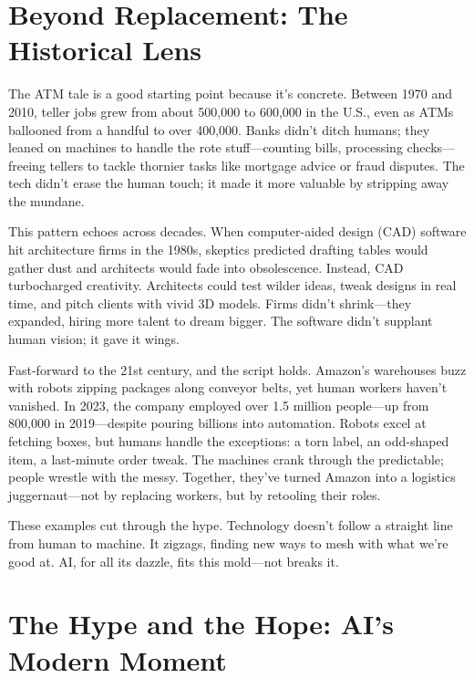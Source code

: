\documentclass[
  Letterpaper,
]{scrbook}
\begin{document}
\section{Beyond Replacement: The Historical
Lens}\label{beyond-replacement-the-historical-lens}

The ATM tale is a good starting point because it's concrete. Between
1970 and 2010, teller jobs grew from about 500,000 to 600,000 in the
U.S., even as ATMs ballooned from a handful to over 400,000. Banks
didn't ditch humans; they leaned on machines to handle the rote
stuff---counting bills, processing checks---freeing tellers to tackle
thornier tasks like mortgage advice or fraud disputes. The tech didn't
erase the human touch; it made it more valuable by stripping away the
mundane.

This pattern echoes across decades. When computer-aided design (CAD)
software hit architecture firms in the 1980s, skeptics predicted
drafting tables would gather dust and architects would fade into
obsolescence. Instead, CAD turbocharged creativity. Architects could
test wilder ideas, tweak designs in real time, and pitch clients with
vivid 3D models. Firms didn't shrink---they expanded, hiring more talent
to dream bigger. The software didn't supplant human vision; it gave it
wings.

Fast-forward to the 21st century, and the script holds.
Amazon's warehouses buzz with robots zipping
packages along conveyor belts, yet human workers haven't vanished. In
2023, the company employed over 1.5 million people---up from 800,000 in
2019---despite pouring billions into automation. Robots excel at
fetching boxes, but humans handle the exceptions: a torn label, an
odd-shaped item, a last-minute order tweak. The machines crank through
the predictable; people wrestle with the messy. Together, they've turned
Amazon into a logistics juggernaut---not by replacing
workers, but by retooling their roles.

These examples cut through the hype. Technology doesn't follow a
straight line from human to machine. It zigzags, finding new ways to
mesh with what we're good at. AI, for all its dazzle, fits this
mold---not breaks it.

\section{The Hype and the Hope: AI's Modern
Moment}\label{the-hype-and-the-hope-ais-modern-moment}
\end{document}
